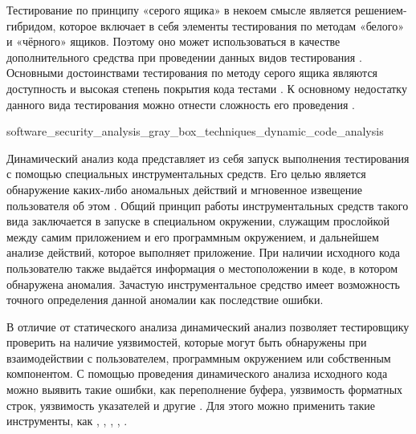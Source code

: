 %
Тестирование по принципу «серого ящика» в некоем смысле является решением-гибридом, которое 
включает в себя элементы тестирования по методам «белого» и «чёрного» ящиков. 
%
Поэтому оно может использоваться в качестве дополнительного средства при проведении данных видов 
тестирования . 
%
Основными достоинствами тестирования по методу серого ящика являются доступность и высокая степень 
покрытия кода тестами . 
%
К основному недостатку данного вида тестирования можно отнести сложность его проведения 
.


	{software_security_analysis_gray_box_techniques_dynamic_code_analysis}

%
Динамический анализ кода представляет из себя запуск выполнения тестирования 
 с помощью специальных инструментальных средств. 
%
Его целью является  обнаружение каких-либо аномальных действий и мгновенное извещение пользователя 
об этом . 
%
Общий принцип работы инструментальных средств такого вида заключается в запуске 
 в специальном окружении, служащим прослойкой между самим приложением и 
его программным окружением, и дальнейшем анализе действий, которое выполняет приложение. 
%
При наличии исходного кода пользователю также выдаётся информация о местоположении в коде, 
в котором обнаружена аномалия. 
%
Зачастую инструментальное средство имеет возможность точного определения данной аномалии как 
последствие ошибки.

В отличие от статического анализа динамический анализ позволяет тестировщику проверить 
 на наличие уязвимостей, которые могут быть обнаружены при взаимодействии 
с пользователем, программным окружением или собственным компонентом. 
%
С помощью проведения динамического анализа исходного кода можно выявить такие ошибки, как 
переполнение буфера, уязвимость форматных строк, уязвимость указателей и другие 
. 
%
Для этого можно применить такие инструменты, как  , 
 ,  , 
 ,  .

